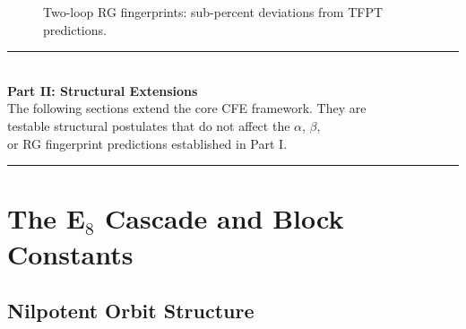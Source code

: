\begin{figure}[H]
\centering
{}
\caption{Two-loop RG fingerprints: sub-percent deviations from TFPT predictions.}
\label{fig:twoloop}
\end{figure}

\vspace{1em}
\begin{center}
\rule{0.8\textwidth}{0.5pt}\\[0.5em]
{\Large\bfseries Part II: Structural Extensions}\\[0.3em]
{\small The following sections extend the core CFE framework. They are \\
testable structural postulates that do not affect the $\alpha$, $\beta$, \\
or RG fingerprint predictions established in Part I.}\\[0.5em]
\rule{0.8\textwidth}{0.5pt}
\end{center}
\vspace{1em}

\section{The E$_8$ Cascade and Block Constants}

\subsection{Nilpotent Orbit Structure}

